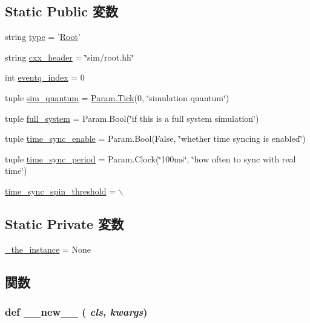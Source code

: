 \subsection*{Static Public 変数}
\begin{DoxyCompactItemize}
\item 
string \hyperlink{classRoot_1_1Root_acce15679d830831b0bbe8ebc2a60b2ca}{type} = '\hyperlink{classRoot_1_1Root}{Root}'
\item 
string \hyperlink{classRoot_1_1Root_a17da7064bc5c518791f0c891eff05fda}{cxx\_\-header} = \char`\"{}sim/root.hh\char`\"{}
\item 
int \hyperlink{classRoot_1_1Root_a76f54d4ab6be836ebb29c4626581bb83}{eventq\_\-index} = 0
\item 
tuple \hyperlink{classRoot_1_1Root_a8b89da90280368eb70b1dcdc80b7bcff}{sim\_\-quantum} = \hyperlink{base_2types_8hh_a5c8ed81b7d238c9083e1037ba6d61643}{Param.Tick}(0, \char`\"{}simulation quantum\char`\"{})
\item 
tuple \hyperlink{classRoot_1_1Root_a63a02cfa137741181a2af17e02bcea9b}{full\_\-system} = Param.Bool(\char`\"{}if this is a full system simulation\char`\"{})
\item 
tuple \hyperlink{classRoot_1_1Root_a4b2627ca12c207b2264371b86283ee16}{time\_\-sync\_\-enable} = Param.Bool(False, \char`\"{}whether time syncing is enabled\char`\"{})
\item 
tuple \hyperlink{classRoot_1_1Root_ac83b50be6a4c522df2c3c2c0e3e30fc0}{time\_\-sync\_\-period} = Param.Clock(\char`\"{}100ms\char`\"{}, \char`\"{}how often to sync with real time\char`\"{})
\item 
\hyperlink{classRoot_1_1Root_a8645bacb1accc24cced37b66213d5a10}{time\_\-sync\_\-spin\_\-threshold} = $\backslash$
\end{DoxyCompactItemize}
\subsection*{Static Private 変数}
\begin{DoxyCompactItemize}
\item 
\hyperlink{classRoot_1_1Root_adeccc2b824ad3c0462ec82cc6465d8ae}{\_\-the\_\-instance} = None
\end{DoxyCompactItemize}


\subsection{関数}
\hypertarget{classRoot_1_1Root_a2f15a4676204349e06bcced484b06b70}{
\subsubsection[{\_\-\_\-new\_\-\_\-}]{\setlength{\rightskip}{0pt plus 5cm}def \_\-\_\-new\_\-\_\- ( {\em cls}, \/   {\em kwargs})}}
\label{classRoot_1_1Root_a2f15a4676204349e06bcced484b06b70}



